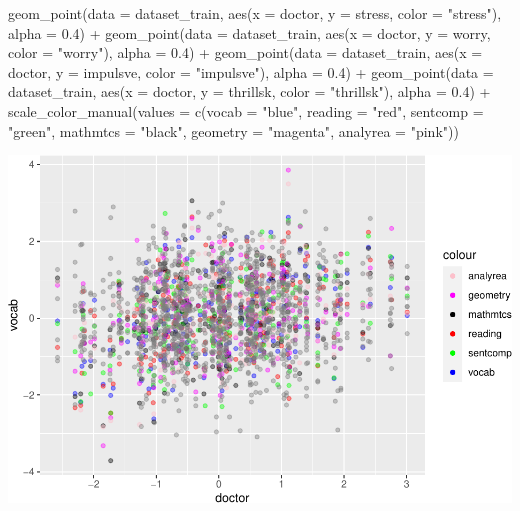 \documentclass[
]{article}
\newenvironment{Shaded}{\begin{snugshade}}{\end{snugshade}}
\newcommand{\AttributeTok}[1]{\textcolor[rgb]{0.77,0.63,0.00}{#1}}
\newcommand{\FloatTok}[1]{\textcolor[rgb]{0.00,0.00,0.81}{#1}}
\newcommand{\FunctionTok}[1]{\textcolor[rgb]{0.00,0.00,0.00}{#1}}
\newcommand{\NormalTok}[1]{#1}
\newcommand{\SpecialCharTok}[1]{\textcolor[rgb]{0.00,0.00,0.00}{#1}}
\newcommand{\StringTok}[1]{\textcolor[rgb]{0.31,0.60,0.02}{#1}}
\begin{document}
\begin{Shaded}
\begin{Highlighting}[]
    \FunctionTok{geom\_point}\NormalTok{(}\AttributeTok{data =}\NormalTok{ dataset\_train, }\FunctionTok{aes}\NormalTok{(}\AttributeTok{x =}\NormalTok{ doctor, }\AttributeTok{y =}\NormalTok{ stress,}
        \AttributeTok{color =} \StringTok{"stress"}\NormalTok{), }\AttributeTok{alpha =} \FloatTok{0.4}\NormalTok{) }\SpecialCharTok{+} \FunctionTok{geom\_point}\NormalTok{(}\AttributeTok{data =}\NormalTok{ dataset\_train,}
    \FunctionTok{aes}\NormalTok{(}\AttributeTok{x =}\NormalTok{ doctor, }\AttributeTok{y =}\NormalTok{ worry, }\AttributeTok{color =} \StringTok{"worry"}\NormalTok{), }\AttributeTok{alpha =} \FloatTok{0.4}\NormalTok{) }\SpecialCharTok{+}
    \FunctionTok{geom\_point}\NormalTok{(}\AttributeTok{data =}\NormalTok{ dataset\_train, }\FunctionTok{aes}\NormalTok{(}\AttributeTok{x =}\NormalTok{ doctor, }\AttributeTok{y =}\NormalTok{ impulsve,}
        \AttributeTok{color =} \StringTok{"impulsve"}\NormalTok{), }\AttributeTok{alpha =} \FloatTok{0.4}\NormalTok{) }\SpecialCharTok{+} \FunctionTok{geom\_point}\NormalTok{(}\AttributeTok{data =}\NormalTok{ dataset\_train,}
    \FunctionTok{aes}\NormalTok{(}\AttributeTok{x =}\NormalTok{ doctor, }\AttributeTok{y =}\NormalTok{ thrillsk, }\AttributeTok{color =} \StringTok{"thrillsk"}\NormalTok{), }\AttributeTok{alpha =} \FloatTok{0.4}\NormalTok{) }\SpecialCharTok{+}
    \FunctionTok{scale\_color\_manual}\NormalTok{(}\AttributeTok{values =} \FunctionTok{c}\NormalTok{(}\AttributeTok{vocab =} \StringTok{"blue"}\NormalTok{, }\AttributeTok{reading =} \StringTok{"red"}\NormalTok{,}
        \AttributeTok{sentcomp =} \StringTok{"green"}\NormalTok{, }\AttributeTok{mathmtcs =} \StringTok{"black"}\NormalTok{, }\AttributeTok{geometry =} \StringTok{"magenta"}\NormalTok{,}
        \AttributeTok{analyrea =} \StringTok{"pink"}\NormalTok{))}
\end{Highlighting}
\end{Shaded}

\includegraphics{HW5-Trinath-Sai-Subhash-Reddy-Pittala_files/figure-latex/unnamed-chunk-19-1.pdf}
\end{document}
